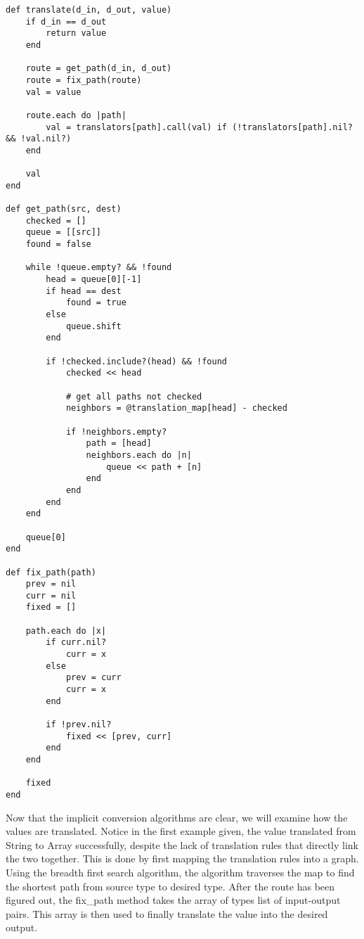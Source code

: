 \begin{lstlisting}[caption={Implicit conversion: translation}]
def translate(d_in, d_out, value)
    if d_in == d_out
        return value
    end

    route = get_path(d_in, d_out)
    route = fix_path(route)
    val = value

    route.each do |path|
        val = translators[path].call(val) if (!translators[path].nil? && !val.nil?)
    end

    val
end

def get_path(src, dest)
    checked = []
    queue = [[src]]
    found = false

    while !queue.empty? && !found
        head = queue[0][-1]
        if head == dest
            found = true
        else
            queue.shift
        end

        if !checked.include?(head) && !found
            checked << head

            # get all paths not checked
            neighbors = @translation_map[head] - checked

            if !neighbors.empty?
                path = [head]
                neighbors.each do |n|
                    queue << path + [n]
                end
            end
        end
    end

    queue[0]
end

def fix_path(path)
    prev = nil
    curr = nil
    fixed = []

    path.each do |x|
        if curr.nil?
            curr = x
        else
            prev = curr
            curr = x
        end

        if !prev.nil?
            fixed << [prev, curr]
        end
    end

    fixed
end
\end{lstlisting}

Now that the implicit conversion algorithms are clear, we will examine how the values are translated.  Notice in the first example given, the value translated from String to Array successfully, despite the lack of translation rules that directly link the two together.  This is done by first mapping the translation rules into a graph.  Using the breadth first search algorithm, the algorithm traverses the map to find the shortest path from source type to desired type.  After the route has been figured out, the fix\_path method takes the array of types list of input{-}output pairs.  This array is then used to finally translate the value into the desired output.

